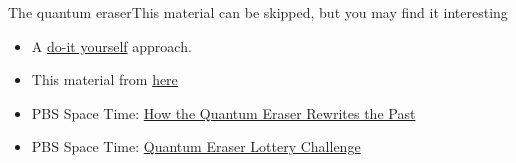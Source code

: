 \begin{frame}{The quantum eraser}{This material can be skipped, but you may find it interesting}
\begin{itemize}
    \item A \href{https://www.scientificamerican.com/article/slide-show-do-it-yourself-diy-quantum-eraser/}{do-it yourself} approach.
    \item This material from \href{https://www.physlab.org/wp-content/uploads/2016/07/machzehnder-v4.pdf}{here}
    \item PBS Space Time: \href{https://www.youtube.com/watch?v=8ORLN_KwAgs}{How the Quantum Eraser Rewrites the Past}
    \item PBS Space Time: \href{https://www.youtube.com/watch?v=2Uzytrooz44}{Quantum Eraser Lottery Challenge}
\end{itemize}
\end{frame}

